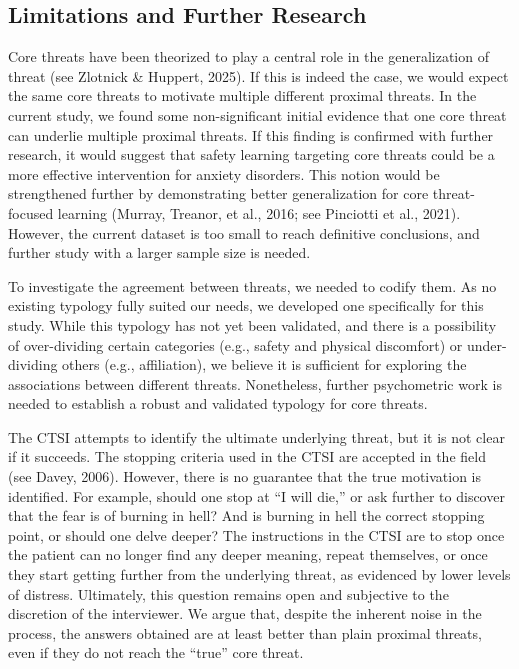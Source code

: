 \documentclass[
  man,floatsintext]{apa7}
\begin{document}
\subsection{Limitations and Further Research}\label{limitations-and-further-research}

Core threats have been theorized to play a central role in the generalization of threat (see Zlotnick \& Huppert, 2025).
If this is indeed the case, we would expect the same core threats to motivate multiple different proximal threats.
In the current study, we found some non-significant initial evidence that one core threat can underlie multiple proximal threats.
If this finding is confirmed with further research, it would suggest that safety learning targeting core threats could be a more effective intervention for anxiety disorders.
This notion would be strengthened further by demonstrating better generalization for core threat-focused learning (Murray, Treanor, et al., 2016; see Pinciotti et al., 2021).
However, the current dataset is too small to reach definitive conclusions, and further study with a larger sample size is needed.

To investigate the agreement between threats, we needed to codify them.
As no existing typology fully suited our needs, we developed one specifically for this study.
While this typology has not yet been validated, and there is a possibility of over-dividing certain categories (e.g., safety and physical discomfort) or under-dividing others (e.g., affiliation), we believe it is sufficient for exploring the associations between different threats.
Nonetheless, further psychometric work is needed to establish a robust and validated typology for core threats.

The CTSI attempts to identify the ultimate underlying threat, but it is not clear if it succeeds.
The stopping criteria used in the CTSI are accepted in the field (see Davey, 2006).
However, there is no guarantee that the true motivation is identified.
For example, should one stop at ``I will die,'' or ask further to discover that the fear is of burning in hell?
And is burning in hell the correct stopping point, or should one delve deeper?
The instructions in the CTSI are to stop once the patient can no longer find any deeper meaning, repeat themselves, or once they start getting further from the underlying threat, as evidenced by lower levels of distress.
Ultimately, this question remains open and subjective to the discretion of the interviewer.
We argue that, despite the inherent noise in the process, the answers obtained are at least better than plain proximal threats, even if they do not reach the ``true'' core threat.
\end{document}
